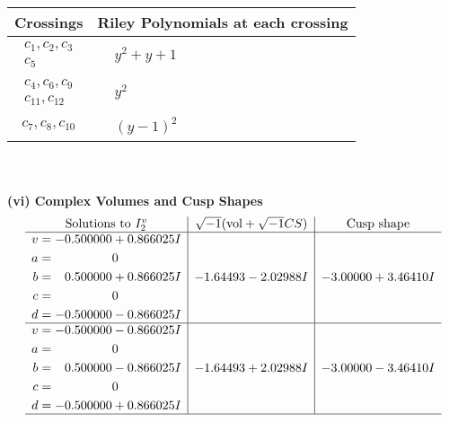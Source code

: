 \documentclass[1p]{elsarticle_modified}
\theoremstyle{definition}
\newcommand{\I}{\sqrt{-1}}
\begin{document}
\begin{tabular}{m{50pt}|m{274pt}}
Crossings & \hspace{64pt}Riley Polynomials at each crossing \\
\hline $$\begin{aligned}c_{1},c_{2},c_{3}\\c_{5}\end{aligned}$$&$\begin{aligned}
&y^2+y+1
\end{aligned}$\\
\hline $$\begin{aligned}c_{4},c_{6},c_{9}\\c_{11},c_{12}\end{aligned}$$&$\begin{aligned}
&y^2
\end{aligned}$\\
\hline $$\begin{aligned}c_{7},c_{8},c_{10}\end{aligned}$$&$\begin{aligned}
&(y-1)^2
\end{aligned}$\\
\hline
\end{tabular}\\~\\
\newpage\flushleft \textbf{(vi) Complex Volumes and Cusp Shapes}
$$\begin{array}{c|c|c}  
\text{Solutions to }I^v_{2}& \I (\text{vol} + \sqrt{-1}CS) & \text{Cusp shape}\\
 \hline 
\begin{aligned}
v &= -0.500000 + 0.866025 I \\
a &= \phantom{-0.000000 } 0 \\
b &= \phantom{-}0.500000 + 0.866025 I \\
c &= \phantom{-0.000000 } 0 \\
d &= -0.500000 - 0.866025 I\end{aligned}
 & -1.64493 - 2.02988 I & -3.00000 + 3.46410 I \\ \hline\begin{aligned}
v &= -0.500000 - 0.866025 I \\
a &= \phantom{-0.000000 } 0 \\
b &= \phantom{-}0.500000 - 0.866025 I \\
c &= \phantom{-0.000000 } 0 \\
d &= -0.500000 + 0.866025 I\end{aligned}
 & -1.64493 + 2.02988 I & -3.00000 - 3.46410 I\\
 \hline 
 \end{array}$$\newpage\newpage\renewcommand{\arraystretch}{1}
\end{document}
